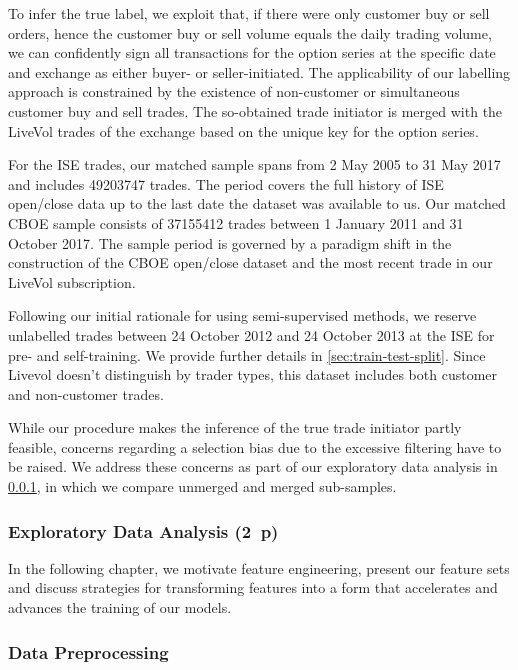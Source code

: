 To infer the true label, we exploit that, if there were only customer buy or sell orders, hence the customer buy or sell volume equals the daily trading volume, we can confidently sign all transactions for the option series at the specific date and exchange as either buyer- or seller-initiated. The applicability of our labelling approach is constrained by the existence of non-customer or simultaneous customer buy and sell trades. The so-obtained trade initiator is merged with the LiveVol trades of the exchange based on the unique key for the option series.

For the \gls{ISE} trades, our matched sample spans from 2 May 2005 to 31 May 2017 and includes \num{49203747} trades. The period covers the full history of \gls{ISE} open/close data up to the last date the dataset was available to us. Our matched \gls{CBOE} sample consists of \num{37155412} trades between 1 January 2011 and 31 October 2017. The sample period is governed by a paradigm shift in the construction of the \gls{CBOE} open/close dataset and the most recent trade in our LiveVol subscription.

Following our initial rationale for using semi-supervised methods, we reserve unlabelled trades between 24 October 2012 and 24 October 2013 at the \gls{ISE} for pre- and self-training. We provide further details in \cref{sec:train-test-split}. Since Livevol doesn't distinguish by trader types, this dataset includes both customer and non-customer trades.

While our procedure makes the inference of the true trade initiator partly feasible, concerns regarding a selection bias due to the excessive filtering have to be raised. We address these concerns as part of our exploratory data analysis in \cref{sec:exploratory-data-analysis}, in which we compare unmerged and merged sub-samples.

\subsubsection{Exploratory Data Analysis (2~p)}\label{sec:exploratory-data-analysis}

In the following chapter, we motivate feature engineering, present our feature sets and discuss strategies for transforming features into a form that accelerates and advances the training of our models.
\subsubsection{Data Preprocessing}\label{sec:data-preprocessing}

